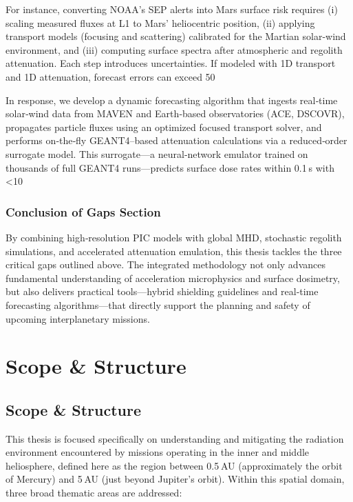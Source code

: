 \documentclass[12pt]{report}
\begin{document}
For instance, converting NOAA’s SEP alerts into Mars surface risk requires (i) scaling measured fluxes at L1 to Mars’ heliocentric position, (ii) applying transport models (focusing and scattering) calibrated for the Martian solar‐wind environment, and (iii) computing surface spectra after atmospheric and regolith attenuation.  Each step introduces uncertainties.  If modeled with 1D transport and 1D attenuation, forecast errors can exceed 50%

In response, we develop a dynamic forecasting algorithm that ingests real‐time solar‐wind data from MAVEN and Earth‐based observatories (ACE, DSCOVR), propagates particle fluxes using an optimized focused transport solver, and performs on‐the‐fly GEANT4–based attenuation calculations via a reduced‐order surrogate model.  This surrogate—a neural‐network emulator trained on thousands of full GEANT4 runs—predicts surface dose rates within 0.1 s with <10%

\subsubsection{Conclusion of Gaps Section}

By combining high‐resolution PIC models with global MHD, stochastic regolith simulations, and accelerated attenuation emulation, this thesis tackles the three critical gaps outlined above.  The integrated methodology not only advances fundamental understanding of acceleration microphysics and surface dosimetry, but also delivers practical tools—hybrid shielding guidelines and real‐time forecasting algorithms—that directly support the planning and safety of upcoming interplanetary missions.


\section{Scope \& Structure}

\subsection{Scope \& Structure}

This thesis is focused specifically on understanding and mitigating the radiation environment encountered by missions operating in the inner and middle heliosphere, defined here as the region between 0.5 AU (approximately the orbit of Mercury) and 5 AU (just beyond Jupiter’s orbit).  Within this spatial domain, three broad thematic areas are addressed:
\end{document}
